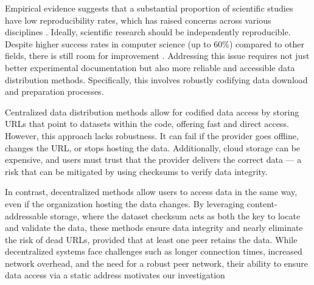 





Empirical evidence suggests that a substantial proportion of scientific studies have low reproducibility
  rates, which has raised concerns across various disciplines \cite{baker_reproducibility_2016}.
Ideally, scientific research should be independently reproducible.
Despite higher success rates in computer science (up to 60\%) compared to other fields, there is still room for improvement
\cite{NEURIPS2019_c429429b, collberg2016repeatability, desai_what_2024}.
Addressing this issue requires not just better experimental documentation but also more reliable and
  accessible data distribution methods.
Specifically, this involves robustly codifying data download and preparation processes.


Centralized data distribution methods allow for codified data access by storing URLs that point to datasets
  within the code, offering fast and direct access.
However, this approach lacks robustness.
It can fail if the provider goes offline, changes the URL, or stops hosting the data.
Additionally, cloud storage can be expensive, and users must trust that the provider delivers the correct
  data --- a risk that can be mitigated by using checksums to verify data integrity.

In contrast, decentralized methods allow users to access data in the same way, even if the organization
  hosting the data changes.
By leveraging content-addressable storage, where the dataset checksum acts as both the key to locate and
  validate the data, these methods ensure data integrity and nearly eliminate the risk of dead URLs, provided
  that at least one peer retains the data.
While decentralized systems face challenges such as longer connection times, increased network overhead, and
  the need for a robust peer network, their ability to ensure data access via a static address
  motivates our investigation

